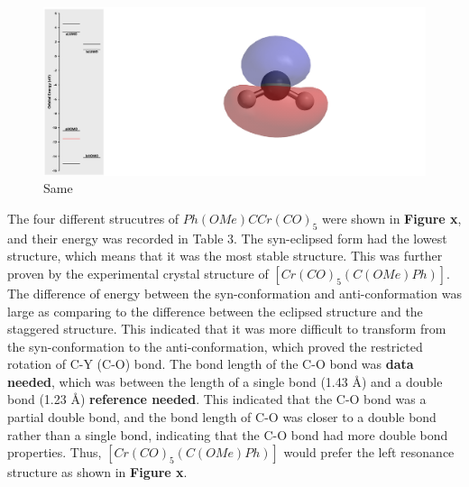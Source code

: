 \documentclass[twocolumn]{article} %
\begin{document}
\begin{figure}[h!]
      \centering
      \includegraphics[width=0.95\columnwidth]{CH2 HOMO-1.png} %
      \vspace{2mm} %
      \caption{Same}
\end{figure}


The four different strucutres of $Ph(OMe)CCr(CO)_5$ were shown in \textbf{Figure x}, and their energy was recorded in Table 3. The syn-eclipsed form had the lowest structure, which means that it was the most stable structure. This was further proven by the experimental crystal structure of $[Cr(CO)_5(C(OMe)Ph)]$. The difference of energy between the syn-conformation and anti-conformation was large as comparing to the difference between the eclipsed structure and the staggered structure. This indicated that it was more difficult to transform from the syn-conformation to the anti-conformation, which proved the restricted rotation of C-Y (C-O) bond. The bond length of the C-O bond was \textbf{data needed}, which was between the length of a single bond (1.43 Å) and a double bond (1.23 Å) \textbf{reference needed}. This indicated that the C-O bond was a partial double bond, and the bond length of C-O was closer to a double bond rather than a single bond, indicating that the C-O bond had more double bond properties. Thus, $[Cr(CO)_5(C(OMe)Ph)]$ would prefer the left resonance structure as shown in \textbf{Figure x}.
\end{document}
